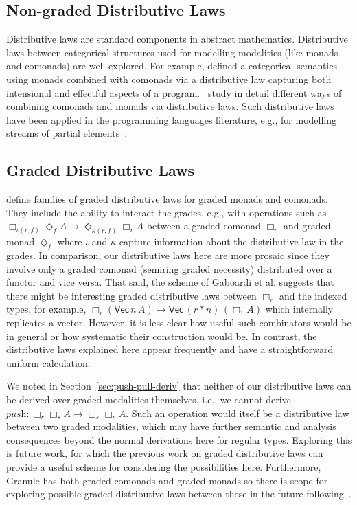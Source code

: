 \subsection{Non-graded Distributive Laws}
Distributive laws are standard components in abstract
mathematics. Distributive laws between categorical structures used for
modelling modalities (like monads and comonads) are well explored. For
example, \citet{brookes1993intensional} defined a categorical semantics using monads
combined with comonads via a distributive law capturing both
intensional and effectful aspects of a
program.~\citet{power2002combining} study in
detail different ways of combining comonads and monads via
distributive laws. Such distributive laws
have been applied in the programming languages literature, e.g., for
modelling streams of partial elements~\citep{uustalu2006essence}.

\subsection{Graded Distributive Laws}
\citet{DBLP:conf/icfp/GaboardiKOBU16} define families of graded distributive laws for graded monads
and comonads. They include the ability to interact the
grades, e.g., with operations such as $\Box_{\iota(r,f)} \Diamond_f A
\rightarrow \Diamond_{\kappa(r,f)} \Box_r A$ between a graded comonad $\Box_r$
and graded monad $\Diamond_f$ where $\iota$ and $\kappa$ capture information
about the distributive law in the grades. In comparison, our distributive laws
here are more prosaic since they involve only a graded comonad (semiring graded
necessity) distributed over a functor and vice versa. That said, the scheme of
Gaboardi et al. suggests that there might be interesting graded distributive
laws between $\Box_r$ and the indexed types, for example, $\Box_r
(\mathsf{Vec}\, n \, A) \rightarrow \mathsf{Vec}\, (r * n) \, (\Box_1 A)$ which
internally replicates a vector. However, it is less clear how useful such
combinators would be in general or how systematic their construction would be.
In contrast, the distributive laws explained here appear frequently and have a
straightforward uniform calculation.

We noted in Section~\ref{sec:push-pull-deriv} that neither of our distributive laws
can be derived over graded modalities themselves, i.e., we cannot derive
$\textit{push} : \Box_r \Box_s A \rightarrow \Box_s \Box_r A$. Such an operation
would itself be a distributive law between two graded modalities, which may have
further semantic and analysis consequences beyond the normal derivations here
for regular types. Exploring this is future work, for which the previous work on
graded distributive laws can provide a useful scheme for considering the
possibilities here. Furthermore, Granule has both graded comonads and graded
monads so there is scope for exploring possible graded distributive laws between
these in the future following~\citet{DBLP:conf/icfp/GaboardiKOBU16}.

